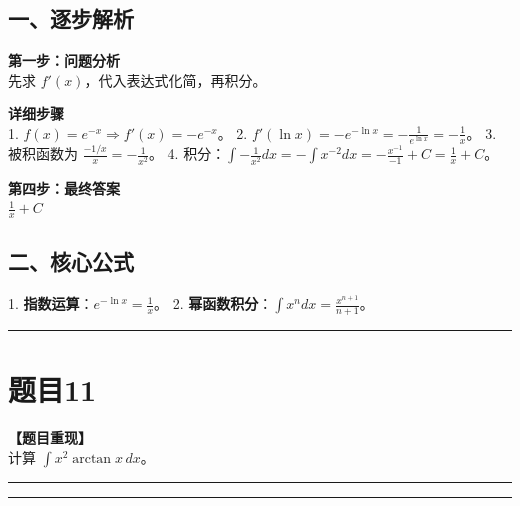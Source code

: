 \documentclass[12pt, a4paper]{ctexart}
\newcommand{\TopSeparator}{
    \par\noindent\rule{\textwidth}{1.5pt}\vspace{0.5em} %
}
\newcommand{\AnalysisSeparator}{
    \par\noindent\rule{\textwidth}{0.5pt}\vspace{0.2em}\hrule\vspace{0.5em} %
}
\newenvironment{RedAnalysis}{
    \par
    \color{red} %
}{
    \par
    \color{black} %
}
\begin{document}
\begin{RedAnalysis}

\subsection*{一、逐步解析}

\textbf{第一步：问题分析} \\
先求 $f'(x)$，代入表达式化简，再积分。

\textbf{详细步骤} \\
1. $f(x) = e^{-x} \Rightarrow f'(x) = -e^{-x}$。
2. $f'(\ln x) = -e^{-\ln x} = - \frac{1}{e^{\ln x}} = -\frac{1}{x}$。
3. 被积函数为 $\frac{-1/x}{x} = -\frac{1}{x^2}$。
4. 积分：$\int -\frac{1}{x^2} dx = - \int x^{-2} dx = - \frac{x^{-1}}{-1} + C = \frac{1}{x} + C$。

\textbf{第四步：最终答案} \\
$ \frac{1}{x} + C $

\subsection*{二、核心公式}
1. \textbf{指数运算}：$e^{-\ln x} = \frac{1}{x}$。
2. \textbf{幂函数积分}：$\int x^n dx = \frac{x^{n+1}}{n+1}$。

\end{RedAnalysis}

\vspace{2em}

\TopSeparator
\section*{题目11}

\textbf{【题目重现】} \\
计算 $ \int x^{2} \arctan x \, dx $。

\AnalysisSeparator
\end{document}

